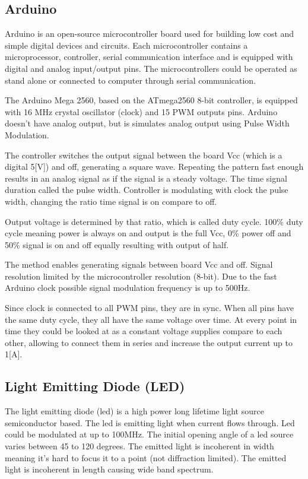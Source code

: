 \documentclass[\main/master.tex]{subfiles}
\begin{document}
\subsection{Arduino}
Arduino is an open-source microcontroller board used for building low cost and simple digital devices and circuits. Each microcontroller contains a microprocessor, controller, serial communication interface and is equipped with digital and analog input/output pins. The microcontrollers could be operated as stand alone or connected to computer through serial communication. 
\par\noindent
The Arduino Mega 2560, based on the ATmega2560 8-bit controller, is equipped with 16 MHz crystal oscillator (clock) and 15 PWM outputs pins. Arduino doesn't have analog output, but is simulates analog output using Pulse Width Modulation.
\par\noindent
The controller switches the output signal between the board Vcc (which is a digital 5[V]) and off, generating a square wave.
Repeating the pattern fast enough results in an analog signal as if the signal is a steady voltage. The time signal duration called the pulse width. Controller is modulating with clock the pulse width, changing the ratio time signal is on compare to off. 
\par\noindent
Output voltage is determined by that ratio, which is called duty cycle. 100\% duty cycle meaning power is always on and output is the full Vcc, 0\% power off and 50\% signal is on and off equally resulting with output of half. 
\par\noindent
The method enables generating signals between board Vcc and off. Signal resolution limited by the microcontroller resolution (8-bit). Due to the fast Arduino clock possible signal modulation frequency is up to 500Hz.
\par\noindent
Since clock is connected to all PWM pins, they are in sync. When all pins have the same duty cycle, they all have the same voltage over time. At every point in time they could be looked at as a constant voltage supplies compare to each other, allowing to connect them in series and increase the output current up to 1[A]. 
\subsection{Light Emitting Diode (LED)}
The light emitting diode (led) is a high power long lifetime light source semiconductor based. The led is emitting light when current flows through. Led could be modulated at up to 100MHz. The initial opening angle of a led source varies between 45 to 120 degrees. The emitted light is incoherent in width meaning it's hard to focus it to a point (not diffraction limited). The emitted light is incoherent in length causing wide band spectrum.
\end{document}
